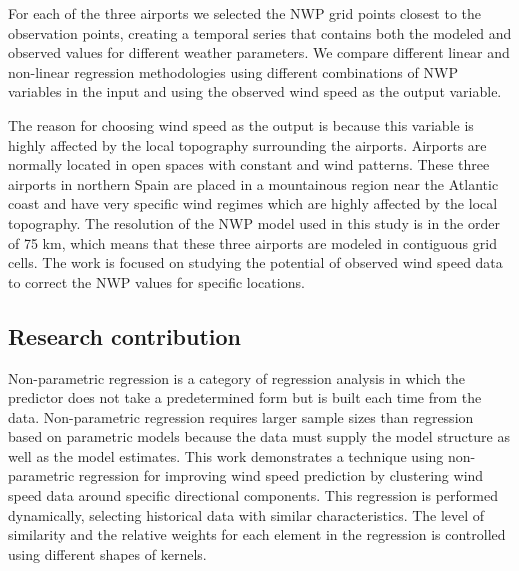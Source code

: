 \medskip

For each of the three airports we selected the NWP grid points closest to the observation points, creating a temporal series that contains both the modeled and observed values for different weather parameters. We compare different linear and non-linear regression methodologies using different combinations of NWP variables in the input and using the observed wind speed as the output variable.

\medskip

The reason for choosing wind speed as the output is because this variable is highly affected by the local topography surrounding the airports. Airports are normally located in open spaces with constant and wind patterns. These three airports in northern Spain are placed in a mountainous region near the Atlantic coast and have very specific wind regimes which are highly affected by the local topography. The resolution of the NWP model used in this study is in the order of 75 km, which means that these three airports are modeled in contiguous grid cells. The work is focused on studying the potential of observed wind speed data to correct the NWP values for specific locations.

\subsection{Research contribution}

Non-parametric regression is a category of regression analysis in which the predictor does not take a predetermined form but is built each time from the data. Non-parametric regression requires larger sample sizes than regression based on parametric models because the data must supply the model structure as well as the model estimates. This work demonstrates a technique using non-parametric regression for improving wind speed prediction by clustering wind speed data around specific directional components. This regression is performed dynamically, selecting historical data with similar characteristics. The level of similarity and the relative weights for each element in the regression is controlled using different shapes of kernels.

\medskip

